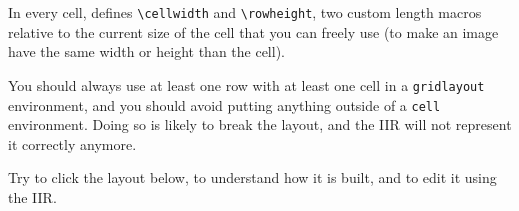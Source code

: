 \documentclass[11pt, a4paper]{article}
\begin{document}
\begin{info}
    In every cell, \iLaTeX{} defines \verb|\cellwidth| and \verb|\rowheight|, two custom length macros relative to the current size of the cell that you can freely use (\eg to make an image have the same width or height than the cell).
\end{info}

\begin{warning}
    You should always use at least one row with at least one cell in a \texttt{gridlayout} environment, and you should avoid putting anything outside of a \texttt{cell} environment.
    Doing so is likely to break the layout, and the IIR will not represent it correctly anymore.
\end{warning}

\begin{example}
    Try to click the layout below, to understand how it is built, and to edit it using the IIR.


\end{example}
\end{document}
